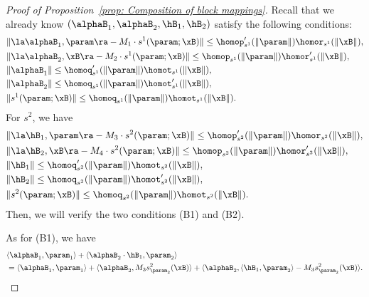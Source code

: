 \begin{proof}[Proof of Proposition~\ref{prop: Composition of block mappings}]
Recall that we already know $(\alphaB_1, \alphaB_2, \hB_1, \hB_2)$ satisfy the following conditions:
\begin{align*}
&\| \la\alphaB_1,\param \ra  - M_1 \cdot {s^1}(\param;\xB)\| \le \homop_{s^1}^\prime (\|\param\|) \homor_{s^1}(\|\xB\|),  \\  
&\| \la \alphaB_2, \xB \ra - M_2 \cdot {s^1}(\param;\xB)\| \le \homop_{s^1} (\|\param\|) \homor_{s^1}^\prime(\|\xB\|),\\ 
&\| \alphaB_1\| \le \homoq_{s^1}^\prime (\|\param\|) \homot_{s^1}(\|\xB\|),  \\  
&\| \alphaB_2 \| \le \homoq_{s^1} (\|\param\|) \homot_{s^1}^\prime(\|\xB\|),\\ 
&\|{s^1}(\param;\xB)\| \le \homoq_{s^1} (\|\param\|) \homot_{s^1}(\|\xB\|).
\end{align*}
For $s^2$, we have 
\begin{align*}
&\| \la \hB_1, \param \ra - M_3 \cdot {s^2}(\param;\xB)\| \le \homop_{s^2}^\prime (\|\param\|) \homor_{s^2}(\|\xB\|),  \\  
&\| \la \hB_2, \xB \ra - M_4 \cdot {s^2}(\param;\xB)\| \le \homop_{s^2} (\|\param\|) \homor_{s^2}^\prime(\|\xB\|), \\ 
&\| \hB_1\| \le \homoq_{s^2}^\prime (\|\param\|) \homot_{s^2}(\|\xB\|), \\  
&\| \hB_2 \| \le \homoq_{s^2} (\|\param\|) \homot_{s^2}^\prime(\|\xB\|), \\ 
&\|{s^2}(\param;\xB)\| \le \homoq_{s^2} (\|\param\|) \homot_{s^2}(\|\xB\|).
\end{align*}
Then, we will verify the two conditions (B1) and (B2). 


As for (B1), we have 
\begin{align*}
&\langle \alphaB_1, \param_1 \rangle 
+ \langle \alphaB_2\cdot \hB_1 , \param_2 \rangle \\ 
& = \langle \alphaB_1, \param_1 \rangle 
+ \langle \alphaB_2 , M_3 s^2_{\param_2}(\xB) \rangle  + \langle \alphaB_2 , \langle \hB_1,\param_2 \rangle - M_3 s^2_{\param_2}(\xB) \rangle. 
\end{align*}


\end{proof}
